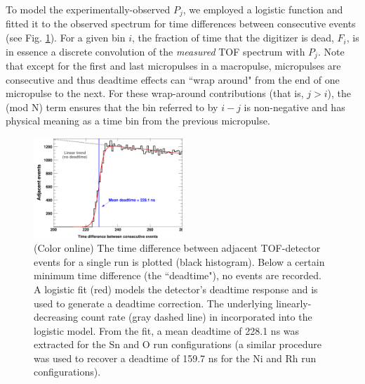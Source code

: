 \documentclass[twocolumn,secnumarabic,amssymb, nobibnotes, aps, prl,
superscriptaddress, nobalancelastpage]{revtex4}
\begin{document}
To model the experimentally-observed $P_{j}$, we
employed a logistic function and fitted it to the observed spectrum for time
differences between consecutive events (see Fig.
\ref{TimeDifferenceBetweenEvents}). For a given bin $i$, the fraction of time that the 
digitizer is dead, $F_{i}$, is in essence a discrete convolution of the
\textit{measured} TOF spectrum with $P_{j}$. Note that except for the first and
last micropulses in a macropulse, micropulses are consecutive and thus deadtime effects can
``wrap around" from the end of one micropulse to the next. For these wrap-around
contributions (that is, $j>i$), the (mod N) term ensures that the bin referred
to by $i-j$ is non-negative and has physical meaning as a time bin from the 
previous micropulse.

\begin{figure}
    \includegraphics[width=0.5\textwidth]{figures/TimeDifferenceBetweenEvents.png}
    \caption{(Color online) The time difference between adjacent TOF-detector
    events for a single run is plotted (black histogram). Below a certain
minimum time difference (the ``deadtime"), no events are recorded. A logistic
fit (red) models the detector's deadtime response and is used to generate a
deadtime correction. The underlying linearly-decreasing count rate (gray dashed
line) in incorporated into the logistic model. From the fit, a mean deadtime of
228.1 ns was extracted for the Sn and O run configurations (a similar
procedure was used to recover a deadtime of 159.7 ns for the Ni and Rh
run configurations).}
    \label{TimeDifferenceBetweenEvents}
\end{figure}
\end{document}
